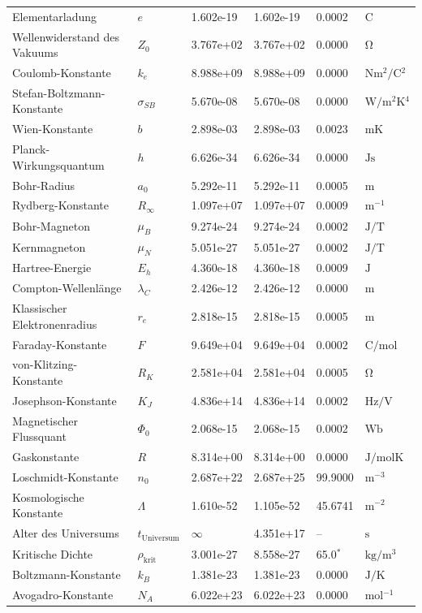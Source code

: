 \begin{longtable}{>{\raggedright}p{4.0cm}p{1.2cm}p{1.8cm}p{2.0cm}p{1.6cm}p{2.0cm}}
		Elementarladung & $e$ & 1.602e-19 & 1.602e-19 & 0.0002 & $\si{\coulomb}$ \\
		Wellenwiderstand des Vakuums & $Z_0$ & 3.767e+02 & 3.767e+02 & 0.0000 & $\si{\ohm}$ \\
		Coulomb-Konstante & $k_e$ & 8.988e+09 & 8.988e+09 & 0.0000 & $\si{\newton \meter^2 \per \coulomb^2}$ \\
		Stefan-Boltzmann-Konstante & $\sigma_{SB}$ & 5.670e-08 & 5.670e-08 & 0.0000 & $\si{\watt \per \meter^2 \kelvin^4}$ \\
		Wien-Konstante & $b$ & 2.898e-03 & 2.898e-03 & 0.0023 & $\si{\meter \kelvin}$ \\
		Planck-Wirkungsquantum & $h$ & 6.626e-34 & 6.626e-34 & 0.0000 & $\si{\joule \second}$ \\
		Bohr-Radius & $a_0$ & 5.292e-11 & 5.292e-11 & 0.0005 & $\si{\meter}$ \\
		Rydberg-Konstante & $R_\infty$ & 1.097e+07 & 1.097e+07 & 0.0009 & $\si{\meter^{-1}}$ \\
		Bohr-Magneton & $\mu_B$ & 9.274e-24 & 9.274e-24 & 0.0002 & $\si{\joule \per \tesla}$ \\
		Kernmagneton & $\mu_N$ & 5.051e-27 & 5.051e-27 & 0.0002 & $\si{\joule \per \tesla}$ \\
		Hartree-Energie & $E_h$ & 4.360e-18 & 4.360e-18 & 0.0009 & $\si{\joule}$ \\
		Compton-Wellenlänge & $\lambda_C$ & 2.426e-12 & 2.426e-12 & 0.0000 & $\si{\meter}$ \\
		Klassischer Elektronenradius & $r_e$ & 2.818e-15 & 2.818e-15 & 0.0005 & $\si{\meter}$ \\
		Faraday-Konstante & $F$ & 9.649e+04 & 9.649e+04 & 0.0002 & $\si{\coulomb \per \mole}$ \\
		von-Klitzing-Konstante & $R_K$ & 2.581e+04 & 2.581e+04 & 0.0005 & $\si{\ohm}$ \\
		Josephson-Konstante & $K_J$ & 4.836e+14 & 4.836e+14 & 0.0002 & $\si{\hertz \per \volt}$ \\
		Magnetischer Flussquant & $\Phi_0$ & 2.068e-15 & 2.068e-15 & 0.0002 & $\si{\weber}$ \\
		Gaskonstante & $R$ & 8.314e+00 & 8.314e+00 & 0.0000 & $\si{\joule \per \mole \kelvin}$ \\
		Loschmidt-Konstante & $n_0$ & 2.687e+22 & 2.687e+25 & 99.9000 & $\si{\meter^{-3}}$ \\
		Kosmologische Konstante & $\Lambda$ & 1.610e-52 & 1.105e-52 & 45.6741 & $\si{\meter^{-2}}$ \\
		Alter des Universums & $t_{\text{Universum}}$ & $\infty$ & 4.351e+17 & -- & $\si{\second}$ \\
		Kritische Dichte & $\rho_{\text{krit}}$ & 3.001e-27 & 8.558e-27 & 65.0$^*$ & $\si{\kilogram \per \meter^3}$ \\
		Boltzmann-Konstante & $k_B$ & 1.381e-23 & 1.381e-23 & 0.0000 & $\si{\joule \per \kelvin}$ \\
		Avogadro-Konstante & $N_A$ & 6.022e+23 & 6.022e+23 & 0.0000 & $\si{\mole^{-1}}$ \\
	\end{longtable}
	\normalsize
	
